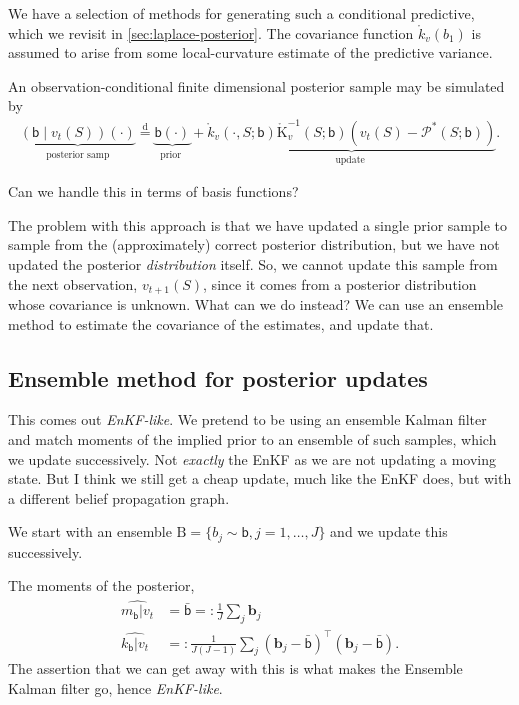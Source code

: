\documentclass{article}
\newcommand{\vv}[1]{\boldsymbol{#1}}
\newcommand{\mm}[1]{\mathrm{#1}}
\newcommand{\rv}[1]{\mathsf{#1}}
\newcommand{\set}[1]{#1}
\newcommand{\op}[1]{\mathscr{#1}}
\newcommand{\disteq}{\stackrel{\mathrm{d}}{=}}
\newcommand{\gvn}{\mid}
\newcommand{\lat}{\rv{b}}   %
\newcommand{\latst}{b}      %
\begin{document}
We have a selection of methods for generating such a conditional predictive, which we revisit in \ref{sec:laplace-posterior}.
The covariance function \(\mathring{k}_{v}(\latst_{1})\) is assumed to arise from some local-curvature estimate of the predictive variance.

An observation-conditional finite dimensional posterior sample may be simulated by~\cite{WilsonPathwise2021}
\begin{align*}
\underbrace{
  (\lat \gvn v_{t}(\set{S}))(\cdot)}_{\text {posterior samp}
  } \disteq
\underbrace{
  \lat(\cdot)}_{\text {prior }
}
+\underbrace{
  \mathring{k}_{v}(\cdot, \set{S};\lat) \mathring{\mm{K}}_{v}^{-1}(\set{S};\lat)\left(v_{t}(\set{S})-\op{P}^*(\set{S};\lat)\right)
}_{\text {update }}.
\end{align*}

Can we handle this in terms of basis functions?~\cite[4.5]{WilsonPathwise2021}

The problem with this approach is that we have updated a single prior sample to sample from the (approximately) correct posterior distribution, but we have not updated the posterior \emph{distribution} itself.
So, we cannot update this sample from the next observation, \(v_{t+1}(\set{S})\), since it comes from a posterior distribution whose covariance is unknown.
What can we do instead?
We can use an ensemble method to estimate the covariance of the estimates, and update that.

\subsection{Ensemble method for posterior updates}

This comes out \emph{EnKF-like}.
We pretend to be using an ensemble Kalman filter and match moments of the implied prior to an ensemble of such samples, which we update successively.
Not \emph{exactly} the EnKF as we are not updating a moving state.
But I think we still get a cheap update, much like the EnKF does, but with a different belief propagation graph.

We start with an ensemble \(\mm{B}=\{\latst_{j}\sim \lat,j=1,\dots,J\}\) and we update this successively.

The moments of the posterior,
\begin{align}
    \widehat{m_{\lat}|v_{t}}
    &= \bar{\lat}
    =: \frac1J\sum_{j}\vv{b}_j\\
    \widehat{k_{\lat}|v_{t}} 
    &=: \frac1{J(J-1)}\sum_{j}\left(\vv{b}_j-\bar{\lat}\right)^\top\left(\vv{b}_j-\bar{\lat}\right).
\end{align}
The assertion that we can get away with this is what makes the Ensemble Kalman filter go, hence \emph{EnKF-like}.
\end{document}
